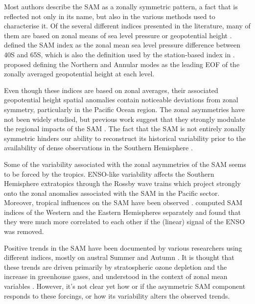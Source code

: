 \documentclass[smallextended]{svjour3}       %
\begin{document}
Most authors describe the SAM as a zonally symmetric pattern, a fact that is reflected not only in its name, but also in the various methods used to characterise it.
Of the several different indices presented in the literature, many of them are based on zonal means of sea level pressure or geopotential height \citep{ho2012}.
\citet{gong1999} defined the SAM index as the zonal mean sea level pressure difference between 40\degree S and 65\degree S, which is also the definition used by the station-based index in \citet{marshall2003}.
\citet{baldwin2009} proposed defining the Northern and Annular modes as the leading EOF of the zonally averaged geopotential height at each level.

Even though these indices are based on zonal averages, their associated geopotential height spatial anomalies contain noticeable deviations from zonal symmetry, particularly in the Pacific Ocean region.
The zonal asymmetries have not been widely studied, but previous work suggest that they strongly modulate the regional impacts of the SAM \citep{fan2007, silvestri2009, fogt2012, rosso2018}.
The fact that the SAM is not entirely zonally symmetric hinders our ability to reconstruct its historical variability prior to the availability of dense observations in the Southern Hemisphere \citep{jones2009}.

Some of the variability associated with the zonal asymmetries of the SAM seems to be forced by the tropics.
ENSO-like variability affects the Southern Hemisphere extratopics through the Rossby wave trains \citep{mo1987, kidson1988, karoly1989} which project strongly onto the zonal anomalies associated with the SAM in the Pacific sector.
Moreover, tropical influences on the SAM have been observed \citep{fan2007, fogt2011, clem2013}.
\citet{fan2007} computed SAM indices of the Western and the Eastern Hemispheres separately and found that they were much more correlated to each other if the (linear) signal of the ENSO was removed.

Positive trends in the SAM have been documented by various researchers using different indices, mostly on austral Summer and Autumn \citep[e.g.][ and references therein]{fogt2020}.
It is thought that these trends are driven primarily by stratospheric ozone depletion and the increase in greenhouse gases, and understood in the context of zonal mean variables \citep{marshall2004, gillett2005, arblaster2006, gillett2013}.
However, it's not clear yet how or if the asymmetric SAM component responds to these forcings, or how its variability alters the observed trends.
\end{document}
